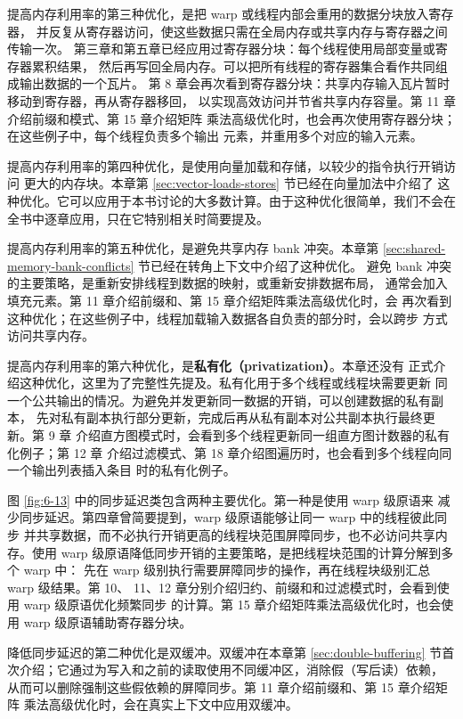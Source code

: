 提高内存利用率的第三种优化，是把 warp 或线程内部会重用的数据分块放入寄存器，
并反复从寄存器访问，使这些数据只需在全局内存或共享内存与寄存器之间传输一次。
第三章和第五章已经应用过寄存器分块：每个线程使用局部变量或寄存器累积结果，
然后再写回全局内存。可以把所有线程的寄存器集合看作共同组成输出数据的一个瓦片。
第 8 章会再次看到寄存器分块：共享内存输入瓦片暂时移动到寄存器，再从寄存器移回，
以实现高效访问并节省共享内存容量。第 11 章介绍前缀和模式、第 15 章介绍矩阵
乘法高级优化时，也会再次使用寄存器分块；在这些例子中，每个线程负责多个输出
元素，并重用多个对应的输入元素。

提高内存利用率的第四种优化，是使用向量加载和存储，以较少的指令执行开销访问
更大的内存块。本章第 \ref{sec:vector-loads-stores} 节已经在向量加法中介绍了
这种优化。它可以应用于本书讨论的大多数计算。由于这种优化很简单，我们不会在
全书中逐章应用，只在它特别相关时简要提及。

提高内存利用率的第五种优化，是避免共享内存 bank 冲突。本章第
\ref{sec:shared-memory-bank-conflicts} 节已经在转角上下文中介绍了这种优化。
避免 bank 冲突的主要策略，是重新安排线程到数据的映射，或重新安排数据布局，
通常会加入填充元素。第 11 章介绍前缀和、第 15 章介绍矩阵乘法高级优化时，会
再次看到这种优化；在这些例子中，线程加载输入数据各自负责的部分时，会以跨步
方式访问共享内存。

提高内存利用率的第六种优化，是\textbf{私有化（privatization）}。本章还没有
正式介绍这种优化，这里为了完整性先提及。私有化用于多个线程或线程块需要更新
同一个公共输出的情况。为避免并发更新同一数据的开销，可以创建数据的私有副本，
先对私有副本执行部分更新，完成后再从私有副本对公共副本执行最终更新。第 9 章
介绍直方图模式时，会看到多个线程更新同一组直方图计数器的私有化例子；第 12 章
介绍过滤模式、第 18 章介绍图遍历时，也会看到多个线程向同一个输出列表插入条目
时的私有化例子。

图 \ref{fig:6-13} 中的同步延迟类包含两种主要优化。第一种是使用 warp 级原语来
减少同步延迟。第四章曾简要提到，warp 级原语能够让同一 warp 中的线程彼此同步
并共享数据，而不必执行开销更高的线程块范围屏障同步，也不必访问共享内存。使用
warp 级原语降低同步开销的主要策略，是把线程块范围的计算分解到多个 warp 中：
先在 warp 级别执行需要屏障同步的操作，再在线程块级别汇总 warp 级结果。第 10、
11、12 章分别介绍归约、前缀和和过滤模式时，会看到使用 warp 级原语优化频繁同步
的计算。第 15 章介绍矩阵乘法高级优化时，也会使用 warp 级原语辅助寄存器分块。

降低同步延迟的第二种优化是双缓冲。双缓冲在本章第 \ref{sec:double-buffering}
节首次介绍；它通过为写入和之前的读取使用不同缓冲区，消除假（写后读）依赖，
从而可以删除强制这些假依赖的屏障同步。第 11 章介绍前缀和、第 15 章介绍矩阵
乘法高级优化时，会在真实上下文中应用双缓冲。


